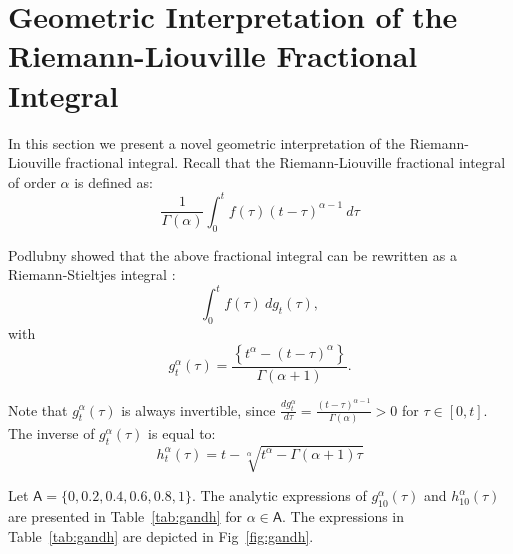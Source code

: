 \documentclass{article}
\theoremstyle{theorem}
\theoremstyle{definition}
\begin{document}
\section{Geometric Interpretation of the Riemann-Liouville Fractional Integral}
In this section we present a novel geometric interpretation of the Riemann-Liouville fractional integral. 
Recall that the Riemann-Liouville fractional integral of order $\alpha$ is defined as:
\begin{equation}
\label{eq:RL_frac_int}
\frac{1}{\Gamma(\alpha)}\int_{0}^{t}f(\tau)(t-\tau)^{\alpha-1}~d\tau
\end{equation}

\noindent
Podlubny showed that the above fractional integral can be rewritten as a Riemann-Stieltjes integral \cite{podlubny02}:
\begin{equation}
\label{eq:rs}
\int_0^{t} f(\tau)~dg_t(\tau),
\end{equation}
with 
\begin{equation}
\label{eq:g_rl}
g_t^{\alpha}(\tau) = \frac{\left \{t^{\alpha} - (t-\tau)^{\alpha} \right \}}{\Gamma(\alpha+1)}. 
\end{equation}

\noindent
Note that $g_t^{\alpha}(\tau)$ is always invertible, since $\frac{d g_t^{\alpha}}{d \tau} = \frac{(t-\tau)^{\alpha-1}}{\Gamma(\alpha)}>0$ for $\tau\in[0,t]$. The inverse 
of $g_t^{\alpha}(\tau)$ is equal to:
\begin{equation}
h_t^{\alpha}(\tau) = t - \sqrt[\alpha]{t^{\alpha} - \Gamma(\alpha+1)\tau}
\end{equation}

\noindent
Let $\mathsf{A} = \{0,0.2,0.4,0.6,0.8,1\}$. The analytic expressions of $g_{10}^{\alpha}(\tau)$ and $h_{10}^{\alpha}(\tau)$ are presented in Table~\ref{tab:gandh} for $\alpha\in\mathsf{A}$. 
The expressions in Table~\ref{tab:gandh} are depicted in Fig~\ref{fig:gandh}.
\end{document}
